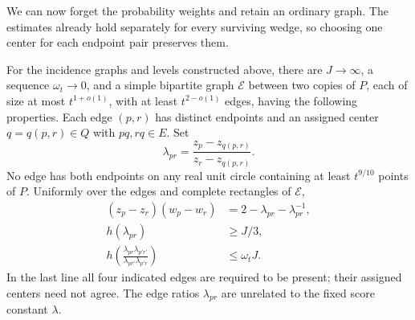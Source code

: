 We can now forget the probability weights and retain an ordinary graph.
The estimates already hold separately for every surviving wedge, so
choosing one center for each endpoint pair preserves them.

\begin{proposition}\label{ext:pairs}
For the incidence graphs and levels constructed above, there are
\(J\to\infty\), a sequence \(\omega_t\to0\), and a simple bipartite graph
\(\mathcal E\) between two copies of \(P\), each of size at most
\(t^{1+o(1)}\), with at least \(t^{2-o(1)}\) edges, having the following
properties.  Each edge \((p,r)\) has distinct endpoints and an assigned
center \(q=q(p,r)\in Q\) with \(pq,rq\in E\).  Set
\[
 \lambda_{pr}=\frac{z_p-z_{q(p,r)}}{z_r-z_{q(p,r)}}.
\]
No edge has both endpoints on any real unit circle containing at least
\(t^{9/10}\) points of \(P\).  Uniformly over the edges and complete
rectangles of \(\mathcal E\),
\begin{align}
 (z_p-z_r)(w_p-w_r)&=2-\lambda_{pr}-\lambda_{pr}^{-1},
                                               \label{ext:pair-identity}\\
 h(\lambda_{pr})&\ge J/3,                      \label{ext:pair-height}\\
 h\!\left(\frac{\lambda_{pr}\lambda_{p'r'}}
                    {\lambda_{pr'}\lambda_{p'r}}\right)
 &\le\omega_tJ.                               \label{ext:rectangle-height}
\end{align}
In the last line all four indicated edges are required to be present;
their assigned centers need not agree.  The edge ratios
\(\lambda_{pr}\) are unrelated to the fixed score constant \(\lambda\).
\end{proposition}

